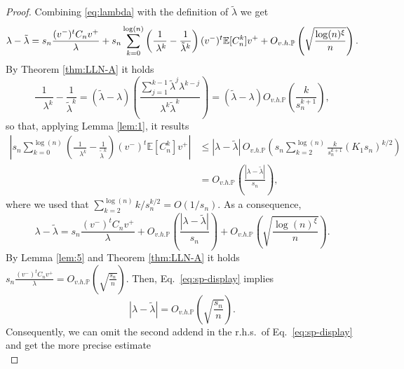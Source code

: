 \documentclass[10pt,a4paper]{amsart}
\newcommand{\E}{\mathbb{E}}
\newcommand{\Ohp}{O_{v.h.\p}}
\newcommand{\centered}{C_n}
\newcommand{\p}{\mathbb{P}}
\newcommand{\scaling}{s_n}
\begin{document}
\begin{proof}
Combining \eqref{eq:lambda} with the definition of $\tilde \lambda$ we get
\begin{equation} \label{eq:equation-H^{(3)}_n}
    \lambda-\tilde\lambda
    = \scaling\frac{(v^-)^t \centered v^+}{\lambda}+\scaling\sum_{k=0}^{\log(n)}\left(\frac{1}{\phantom{\tilde\lambda} \!\!\!\!\ \lambda^k}-\frac{1}{\tilde\lambda^k}\right) (v^-)^t {\E[C^k_n]} v^+ + \Ohp\left(\sqrt{\frac{\log(n)^{\xi}}{n}}\right).
\end{equation}
By Theorem \ref{thm:LLN-A} it holds
\begin{equation} \label{eq:frac1}
    \frac{1}{\phantom{\tilde\lambda} \!\!\!\!\ \lambda^k}-\frac{1}{\tilde\lambda^k}= (\tilde\lambda-\lambda)\left(\frac{\sum_{j=1}^{k-1}\tilde\lambda^j \lambda^{k-j}}{\lambda^k\tilde\lambda^k}\right)=(\tilde\lambda-\lambda)\Ohp\left(\frac{k}{\scaling^{k+1}}\right),
\end{equation}
so that, applying Lemma \ref{lem:1}, it results
\begin{equation} \label{eq:frac2}
\begin{split}
    \left|\scaling\sum_{k=0}^{\log(n)}\left(\frac{1}{\phantom{\tilde\lambda} \!\!\!\!\ \lambda^k}-\frac{1}{\tilde\lambda^k}\right) (v^-)^t {\E[C^k_n]} v^+\right|
    & \le |\lambda-\tilde\lambda|\, \Ohp\left( \scaling \sum_{k=2}^{\log(n)} \frac{k}{\scaling^{k+1}} (K_1 \scaling)^{k/2}\right)\\
    & =\Ohp\left(\frac{|\lambda-\tilde\lambda|}{\scaling}\right),
\end{split}
\end{equation}
where we used that $\sum_{k=2}^{\log(n)} k/\scaling^{k/2}= O(1/\scaling)$.
As a consequence,
\begin{equation} \label{eq:sp-display}
    \lambda-\tilde\lambda=\scaling\frac{(v^-)^t \centered v^+}{\lambda} + \Ohp\left(\frac{|\lambda-\tilde\lambda|}{\scaling}\right)+ \Ohp\left(\sqrt{\frac{\log(n)^{\xi}}{n}}\right).
\end{equation}
By Lemma \ref{lem:5} and Theorem \ref{thm:LLN-A} it holds $\scaling\frac{(v^-)^t {\centered} v^+}{\lambda} = \Ohp(\sqrt{\frac{\scaling}{n}})$. Then, Eq.\ \eqref{eq:sp-display} implies 
\begin{equation} \label{eq:lambdas}
|\lambda-\tilde\lambda|=  \Ohp\left(\sqrt{\frac{\scaling}{n}}\right).\end{equation}
Consequently, we can omit the second addend in the r.h.s.\ of Eq.\ \eqref{eq:sp-display} and get the more precise estimate
    \begin{equation} \label{eq:lambda-2}

\end{equation}
\end{proof}
\end{document}
